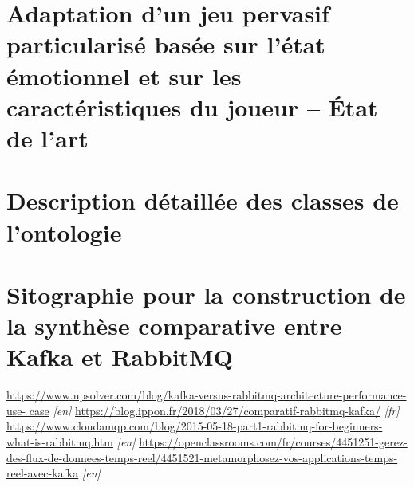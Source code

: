 \documentclass{article}
\begin{document}
\newpage
\renewcommand{\contentsname}{Annexes}\appendix
\section{Adaptation d’un jeu pervasif particularisé basée sur l'état émotionnel et sur les caractéristiques du joueur – État de l’art}\label{ann:eda}
	

\section{Description détaillée des classes de l'ontologie}\label{ann:detailclasses}
	

\section{Sitographie pour la construction de la synthèse comparative entre Kafka et RabbitMQ}\label{ann:kafkarabbitmq}
	\hspace*{-0.5cm}\href{https://www.upsolver.com/blog/kafka-versus-rabbitmq-architecture-performance-use-
	case}{https://www.upsolver.com/blog/kafka-versus-rabbitmq-architecture-performance-use-
	case} \textit{[en]} \medskip\newline
	\href{https://blog.ippon.fr/2018/03/27/comparatif-rabbitmq-kafka/}{https://blog.ippon.fr/2018/03/27/comparatif-rabbitmq-kafka/} \textit{[fr]}\medskip\newline
	\href{https://www.cloudamqp.com/blog/2015-05-18-part1-rabbitmq-for-beginners-what-is-rabbitmq.htm}{https://www.cloudamqp.com/blog/2015-05-18-part1-rabbitmq-for-beginners-what-is-rabbitmq.htm} \textit{[en]}\medskip\newline
	\href{https://openclassrooms.com/fr/courses/4451251-gerez-des-flux-de-donnees-temps-reel/4451521-metamorphosez-vos-applications-temps-reel-avec-kafka}{https://openclassrooms.com/fr/courses/4451251-gerez-des-flux-de-donnees-temps-reel/4451521-metamorphosez-vos-applications-temps-reel-avec-kafka} \textit{[en]}
\end{document}
